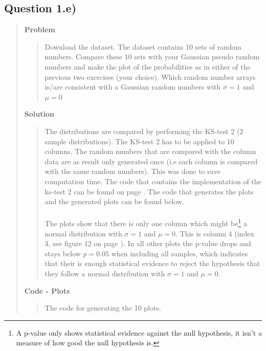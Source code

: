 
\subsection*{\textbf{Question 1.e)}}
\begin{quote}

\textbf{Problem}
\begin{quote}
Download the dataset. The dataset contains 10 sets of random numbers. Compare these 10 sets with your Gaussian pseudo random numbers and make the plot of the probabilities as in either of the previous two exercises (your choice). Which random number arrays is/are consistent with a Gaussian random numbers with $\sigma = 1$ and $\mu = 0$
\end{quote}

\textbf{Solution} 
\begin{quote}
The distributions are compared by performing the KS-test 2 (2 sample distributions). The KS-test 2 has to be applied to 10 columns. The random numbers that are compared with the column data are as result only generated once (i.e each column is  compared with the same random numbers). This was done to save computation time.  The code that contains the implementation of the ks-test 2 can be found on page \pageref{CODE:Statistics}.  The code that generates the plots and the generated plots can be found below.
\\
\\
The plots show that there is only one column which might be\footnote{A p-value only shows statistical evidence against the null hypothesis, it isn't a measure of how good the null hypothesis is.} a normal distribution with $\sigma = 1$ and $\mu = 0$. This is column 4 (index 3, see figure 12 on page \pageref{FIG:Good}). In all other plots the p-value drops and stays below $ p = 0.05$ when including all samples, which indicates that their is enough statistical evidence to reject the hypothesis that they follow a normal distribution with $\sigma = 1$ and $\mu = 0$. 

\end{quote}
\newpage

\textbf{Code - Plots}

\begin{quote}
The code for generating the 10 plots. 

\end{quote}
\newpage



\end{quote}

